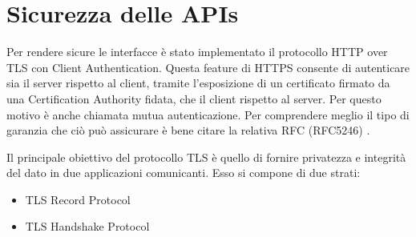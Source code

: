 \documentclass[../main.tex]{subfiles}
\begin{document}
\section{Sicurezza delle APIs}
Per rendere sicure le interfacce è stato implementato il protocollo HTTP over TLS con Client Authentication.
Questa feature di HTTPS consente di autenticare sia il server rispetto al client, tramite l'esposizione di un certificato firmato da una Certification Authority fidata, che il client rispetto al server. Per questo motivo è anche chiamata mutua autenticazione.\newline
Per comprendere meglio il tipo di garanzia che ciò può assicurare è bene citare la relativa RFC (RFC5246) \cite{RFC5246}.

Il principale obiettivo del protocollo TLS è quello di fornire privatezza e integrità del dato in due applicazioni comunicanti.
Esso si compone di due strati:
\begin{itemize}
\item TLS Record Protocol
\item TLS Handshake Protocol
\end{itemize}
\end{document}
